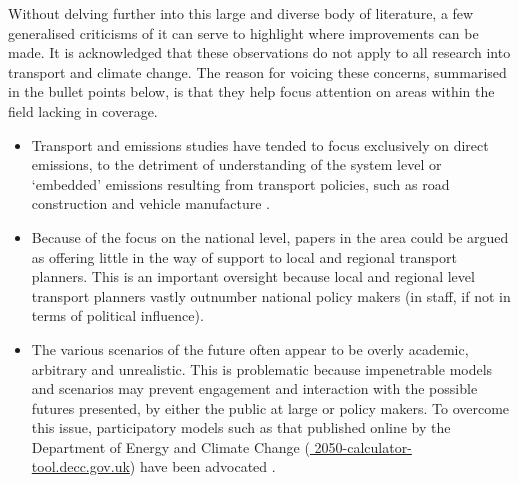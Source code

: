 Without delving further into this large and diverse body of literature,
a few generalised criticisms of it can serve to
highlight where improvements can be made. It is acknowledged that
these observations do not apply to all research into
transport and climate change. The reason for voicing these concerns,
summarised in the bullet points below, is that they
help focus attention on areas within the field lacking in
coverage.
\begin{itemize}
 \item Transport and emissions studies have tended to focus exclusively on
 direct emissions, to the detriment of understanding of the system level or
 `embedded' emissions resulting from transport policies,
 such as road construction and vehicle
 manufacture \citep{Lenzen1999, Wee2005}.
 \item Because of the focus on the national level, papers in the area
 could be argued as offering little in the way of support to local and regional transport
 planners. This is an important oversight because local and regional level
 transport planners vastly outnumber national policy makers (in staff, if not
 in terms of political influence).
 \item The various scenarios of the future often appear to be overly academic,
 arbitrary and unrealistic. This is
 problematic because impenetrable models and scenarios
 may prevent engagement and interaction with the
 possible futures presented, by either the public at large or policy makers.
 To overcome this issue, participatory models
 such as that published online by the Department of Energy and Climate Change
 (\href{http://2050-calculator-tool.decc.gov.uk/pathways/11111111111111111111111111111111111111111111111111111/primary_energy_chart}
 {\color{blue} 2050-calculator-tool.decc.gov.uk}) have been advocated
 \citep{fulton2012exploring}.
\end{itemize}


